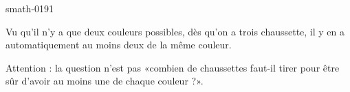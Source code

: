 
\begin{corrige}{smath-0191}

    Vu qu'il n'y a que deux couleurs possibles, dès qu'on a trois chaussette, il y en a automatiquement au moins deux de la même couleur.

    Attention : la question n'est pas «combien de chaussettes faut-il tirer pour être sûr d'avoir au moins une de chaque couleur ?».

\end{corrige}
